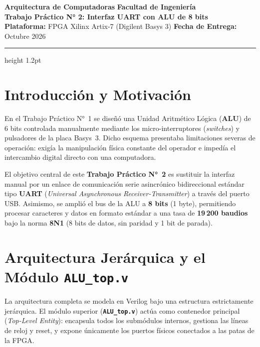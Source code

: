 \documentclass[10.5pt,a4paper]{article}
\begin{document}
\begin{flushleft}
    {\large \textbf{\textcolor{primary}{Arquitectura de Computadoras}}} \hfill {\small \textbf{Facultad de Ingeniería}}\\[0.15em]
    {\LARGE \textbf{\textcolor{primary}{Trabajo Práctico N° 2: Interfaz UART con ALU de 8 bits}}}\\[0.2em]
    {\normalsize \textbf{Plataforma:} FPGA Xilinx Artix-7 (Digilent Basys 3) \hfill \textbf{Fecha de Entrega:} Octubre 2026}
\end{flushleft}
\vspace{-0.4em}
\hrule height 1.2pt
\vspace{0.4em}

\section{Introducción y Motivación}
En el Trabajo Práctico N°~1 se diseñó una Unidad Aritmético Lógica (\textbf{ALU}) de 6 bits controlada manualmente mediante los micro-interruptores (\textit{switches}) y pulsadores de la placa Basys~3. Dicho esquema presentaba limitaciones severas de operación: exigía la manipulación física constante del operador e impedía el intercambio digital directo con una computadora.

El objetivo central de este \textbf{Trabajo Práctico N°~2} es sustituir la interfaz manual por un enlace de comunicación serie asincrónico bidireccional estándar tipo \textbf{UART} (\textit{Universal Asynchronous Receiver-Transmitter}) a través del puerto USB. Asimismo, se amplió el bus de la ALU a \textbf{8 bits} (1 byte), permitiendo procesar caracteres y datos en formato estándar a una tasa de \textbf{19\,200 baudios} bajo la norma \textbf{8N1} (8 bits de datos, sin paridad y 1 bit de parada).

\section{Arquitectura Jerárquica y el Módulo \texttt{ALU\_top.v}}
La arquitectura completa se modela en Verilog bajo una estructura estrictamente jerárquica. El módulo superior (\textbf{\texttt{ALU\_top.v}}) actúa como contenedor principal (\textit{Top-Level Entity}): encapsula todos los submódulos internos, gestiona las líneas de reloj y reset, y expone únicamente los puertos físicos conectados a las patas de la FPGA.
\end{document}
